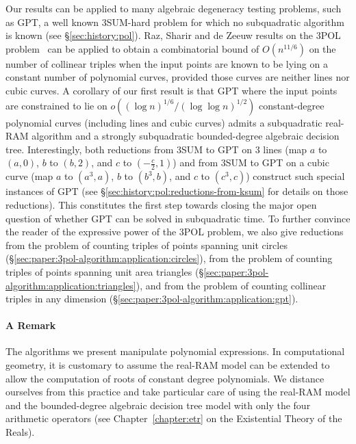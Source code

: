Our results can be applied to many algebraic degeneracy testing problems, such
as GPT, a well known 3SUM-hard problem for which no subquadratic algorithm is
known (see \S\ref{sec:history:pol}).
%
Raz, Sharir
and de Zeeuw results on the 3POL problem~\cite{RSZ15} can be applied to obtain
a combinatorial bound of $O(n^{11/6})$ on the
number of collinear triples when the input points are known to be lying on
a constant number of polynomial curves, provided those curves are neither
lines nor cubic curves.
%
A corollary of our first result is that
GPT where the input points are constrained to lie on
$o({(\log n)}^{1/6}/{(\log \log n)}^{1/2})$
constant-degree polynomial curves (including lines and cubic curves)
admits a subquadratic real-RAM algorithm and
a strongly subquadratic bounded-degree algebraic decision tree.
Interestingly, both reductions from 3SUM to GPT on 3 lines (map $a$ to $(a,0)$,
$b$ to $(b,2)$, and $c$ to $(-\frac c2, 1)$) and from 3SUM to GPT on a
cubic curve (map $a$ to $(a^3,a)$, $b$ to $(b^3,b)$, and $c$ to $(c^3,c)$)
construct such special instances of GPT (see
\S\ref{sec:history:pol:reductions-from-ksum} for details on those reductions).
This constitutes the first step towards closing the major open question of
whether GPT can be solved in subquadratic time.
%
To further convince the reader of the expressive power of the 3POL problem,
we also give reductions
from the problem of counting triples of points spanning
unit circles (\S\ref{sec:paper:3pol-algorithm:application:circles}),
from the problem of counting triples of points spanning unit area
triangles (\S\ref{sec:paper:3pol-algorithm:application:triangles}),
and
from the problem of counting collinear triples in any dimension
(\S\ref{sec:paper:3pol-algorithm:application:gpt}).


\paragraph{A Remark}

The algorithms we present manipulate polynomial expressions.
%
In computational geometry, it is customary to assume the real-RAM model can be
extended to allow the computation of roots of constant degree polynomials.
We distance ourselves from this practice and take particular care
of using the real-RAM model and the bounded-degree algebraic decision tree
model with only the four arithmetic operators (see Chapter~\ref{chapter:etr} on
the Existential Theory of the Reals).
